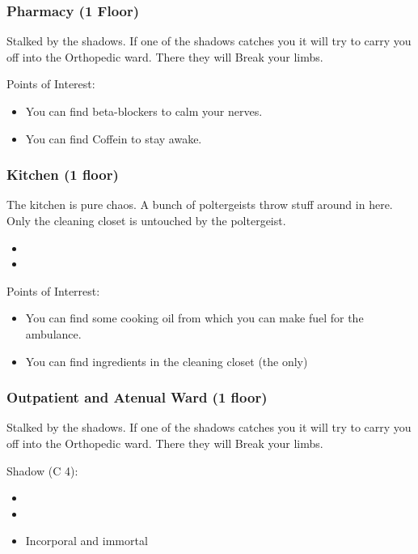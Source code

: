 \documentclass[11pt]{article}
\begin{document}
{\subsubsection{Pharmacy (1 Floor)}
\label{sec:org985880e}

Stalked by the shadows. If one of the shadows catches you it will try to carry you off into the Orthopedic ward. There they will Break your limbs.

Points of Interest:
\begin{itemize}
\item You can find beta-blockers to calm your nerves.
\item You can find Coffein to stay awake.
\end{itemize}
\subsubsection{Kitchen (1 floor)}
\label{sec:org8d071e4}

The kitchen is pure chaos. A bunch of poltergeists throw stuff around in here. Only the cleaning closet is untouched by the poltergeist.

\begin{itemize}
\item {}
\item {}
\end{itemize}

Points of Interrest:
\begin{itemize}
\item You can find some cooking oil from which you can make fuel for the ambulance.
\item You can find ingredients in the cleaning closet (the only)
\end{itemize}
\subsubsection{Outpatient and Atenual Ward (1 floor)}
\label{sec:org267baa4}

Stalked by the shadows. If one of the shadows catches you it will try to carry you off into the Orthopedic ward. There they will Break your limbs.

Shadow (C 4):
\begin{itemize}
\item {}
\item {}
\item Incorporal and immortal
\end{itemize}
}
\end{document}
